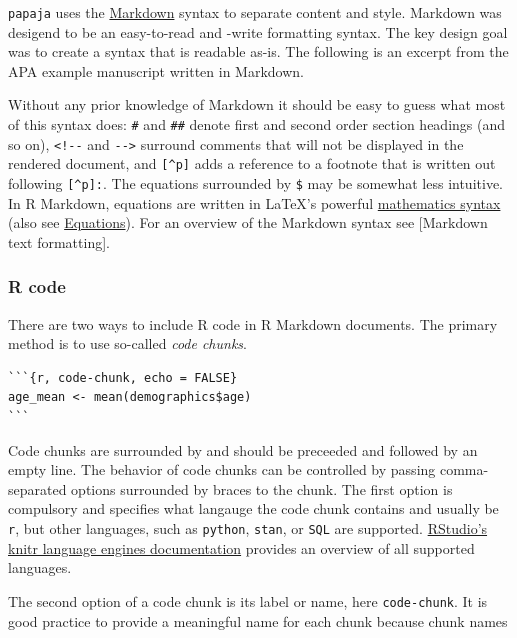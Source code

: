 \documentclass[man,floatsintext]{apa6}
\theoremstyle{definition}
\theoremstyle{definition}
\theoremstyle{definition}
\theoremstyle{remark}
\begin{document}
\texttt{papaja} uses the
\href{http://en.wikipedia.org/wiki/Markdown}{Markdown} syntax to
separate content and style. Markdown was desigend to be an easy-to-read
and -write formatting syntax. The key design goal was to create a syntax
that is readable as-is. The following is an excerpt from the APA example
manuscript written in Markdown.

Without any prior knowledge of Markdown it should be easy to guess what
most of this syntax does: \texttt{\#} and \texttt{\#\#} denote first and
second order section headings (and so on), \texttt{\textless{}!-\/-} and
\texttt{-\/-\textgreater{}} surround comments that will not be displayed
in the rendered document, and \texttt{{[}\^{}p{]}} adds a reference to a
footnote that is written out following \texttt{{[}\^{}p{]}:}. The
equations surrounded by \texttt{\$} may be somewhat less intuitive. In R
Markdown, equations are written in LaTeX's powerful
\href{https://en.wikibooks.org/wiki/LaTeX/Mathematics}{mathematics
syntax} (also see \protect\hyperlink{equations}{Equations}). For an
overview of the Markdown syntax see {[}Markdown text formatting{]}.

\subsubsection{R code}\label{r-code}

There are two ways to include R code in R Markdown documents. The
primary method is to use so-called \emph{code chunks}.

\begin{verbatim}
```{r, code-chunk, echo = FALSE}
age_mean <- mean(demographics$age)
```
\end{verbatim}

Code chunks are surrounded by
\texttt{\textasciigrave{}\textasciigrave{}\textasciigrave{}} and should
be preceeded and followed by an empty line. The behavior of code chunks
can be controlled by passing comma-separated options surrounded by
braces to the chunk. The first option is compulsory and specifies what
langauge the code chunk contains and usually be \texttt{r}, but other
languages, such as \texttt{python}, \texttt{stan}, or \texttt{SQL} are
supported.
\href{http://rmarkdown.rstudio.com/authoring_knitr_engines.html}{RStudio's
knitr language engines documentation} provides an overview of all
supported languages.

The second option of a code chunk is its label or name, here
\texttt{code-chunk}. It is good practice to provide a meaningful name
for each chunk because chunk names
\end{document}
